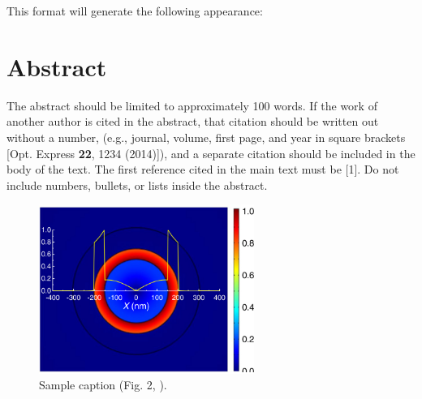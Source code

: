 \documentclass{optica-article}
\begin{document}
This format will generate the following appearance:

\medskip

\author{Author One and Author Two}

\address{Peer Review, Publications Department,
Optica Publishing Group, 2010 Massachusetts Avenue NW, Washington, DC 20036, USA\\
Publications Department, Optica Publishing Group, 2010 Massachusetts Avenue NW, Washington, DC 20036, USA\\
The authors contributed equally to this work.\\
\authormark{*}opex@optica.org}
\medskip

\section{Abstract}
The abstract should be limited to approximately 100 words. If the work of another author is cited in the abstract, that citation should be written out without a number, (e.g., journal, volume, first page, and year in square brackets [Opt. Express {\bfseries 22}, 1234 (2014)]), and a separate citation should be included in the body of the text. The first reference cited in the main text must be [1]. Do not include numbers, bullets, or lists inside the abstract.

\begin{figure}[h!]
\centering\includegraphics[width=7cm]{opticafig1}
\caption{Sample caption (Fig. 2, \cite{Yelin:03}).}
\end{figure}
\end{document}

